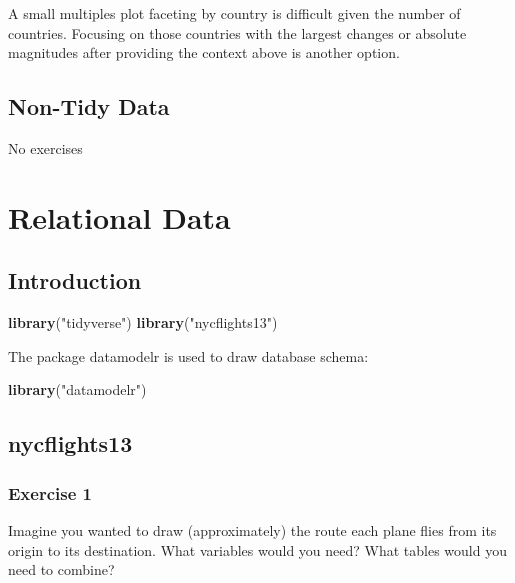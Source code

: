 \documentclass[]{book}
\newenvironment{Shaded}{\begin{snugshade}}{\end{snugshade}}
\newcommand{\KeywordTok}[1]{\textcolor[rgb]{0.13,0.29,0.53}{\textbf{#1}}}
\newcommand{\NormalTok}[1]{#1}
\newcommand{\StringTok}[1]{\textcolor[rgb]{0.31,0.60,0.02}{#1}}
\theoremstyle{definition}
\theoremstyle{definition}
\theoremstyle{definition}
\theoremstyle{remark}
\begin{document}
A small multiples plot faceting by country is difficult given the number
of countries. Focusing on those countries with the largest changes or
absolute magnitudes after providing the context above is another option.

\hypertarget{non-tidy-data}{%
\section{Non-Tidy Data}\label{non-tidy-data}}

No exercises

\hypertarget{relational-data}{%
\chapter{Relational Data}\label{relational-data}}

\hypertarget{introduction-7}{%
\section{Introduction}\label{introduction-7}}

\begin{Shaded}
\begin{Highlighting}[]
\KeywordTok{library}\NormalTok{(}\StringTok{"tidyverse"}\NormalTok{)}
\KeywordTok{library}\NormalTok{(}\StringTok{"nycflights13"}\NormalTok{)}
\end{Highlighting}
\end{Shaded}

The package datamodelr is used to draw database schema:

\begin{Shaded}
\begin{Highlighting}[]
\KeywordTok{library}\NormalTok{(}\StringTok{"datamodelr"}\NormalTok{)}
\end{Highlighting}
\end{Shaded}

\hypertarget{nycflights13}{%
\section{nycflights13}\label{nycflights13}}

\hypertarget{exercise-1-21}{%
\subsection{Exercise 1}\label{exercise-1-21}}

Imagine you wanted to draw (approximately) the route each plane flies
from its origin to its destination. What variables would you need? What
tables would you need to combine?
\end{document}
